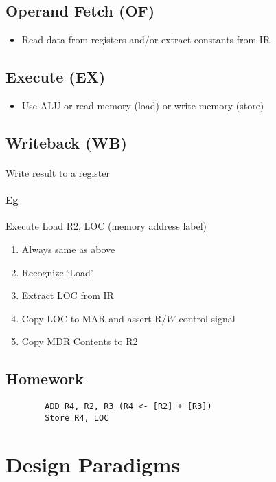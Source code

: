     \subsection{Operand Fetch (OF)}
      \begin{itemize}
        \item Read data from registers and/or extract constants from IR
      \end{itemize}

    \subsection{Execute (EX)}
      \begin{itemize}
        \item Use ALU or read memory (load) or write memory (store)
      \end{itemize}

    \subsection{Writeback (WB)}
      \paragraph{} Write result to a register
      \paragraph{Eg} Execute Load R2, LOC (memory address label)
      \begin{enumerate}
        \item Always same as above
        \item Recognize `Load'
        \item Extract LOC from IR
        \item Copy LOC to MAR and assert R/$\bar{W}$ control signal
        \item Copy MDR Contents to R2
      \end{enumerate}

    \subsection{Homework}
      \begin{lstlisting}
        ADD R4, R2, R3 (R4 <- [R2] + [R3])
        Store R4, LOC
      \end{lstlisting}

  \section{Design Paradigms}
